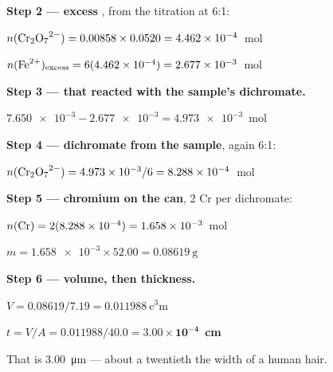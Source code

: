 \documentclass{apchem-exam}
\begin{document}
\begin{parts}
{\begin{apcanswer}
        \textbf{Step 2 --- excess }, from the titration at 6:1:

        $n(\ce{Cr2O7^2-}) = 0.00858 \times 0.0520 = \num{4.462e-4}$~mol

        $n(\ce{Fe^2+})_{\text{excess}} = 6(\num{4.462e-4})
        = \num{2.677e-3}$~mol

        \textbf{Step 3 ---  that reacted with the sample's
        dichromate.}

        $\num{7.650e-3} - \num{2.677e-3} = \num{4.973e-3}$~mol

        \textbf{Step 4 --- dichromate from the sample}, again 6:1:

        $n(\ce{Cr2O7^2-}) = \num{4.973e-3}/6 = \num{8.288e-4}$~mol

        \textbf{Step 5 --- chromium on the can}, 2 Cr per dichromate:

        $n(\ce{Cr}) = 2(\num{8.288e-4}) = \num{1.658e-3}$~mol

        $m = \num{1.658e-3} \times 52.00 = \SI{0.08619}{\gram}$

        \textbf{Step 6 --- volume, then thickness.}

        $V = 0.08619/7.19 = \SI{0.011988}{\cubic\centi\metre}$

        $t = V/A = 0.011988/40.0
        = \mathbf{3.00 \times 10^{-4}}$~\textbf{cm}

        That is \SI{3.00}{\micro\metre} --- about a twentieth the width of
        a human hair.\end{apcanswer}}
\end{parts}

\begin{rubric}
\end{rubric}

\examtotal
\end{document}
